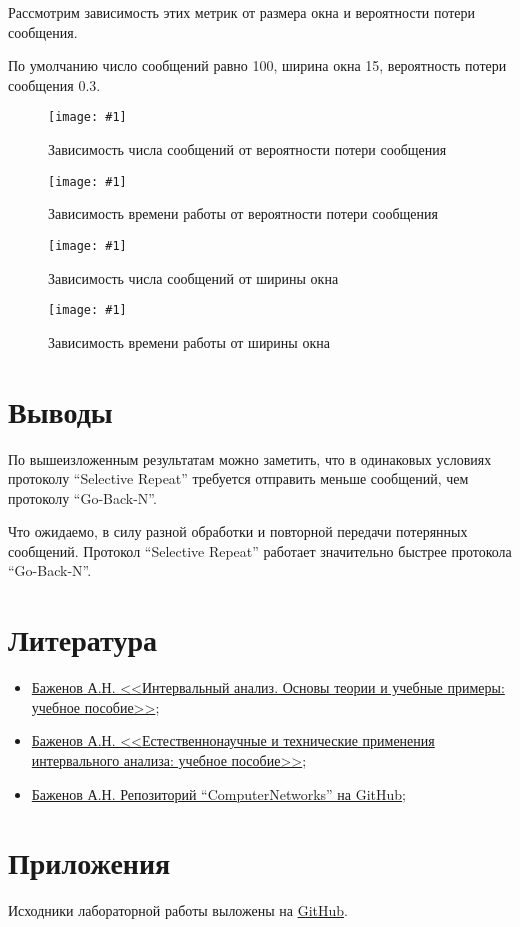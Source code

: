 \documentclass[a4paper,12pt]{article}
\newcommand{\plot}[3]{
  \begin{figure}[H]
    \begin{center}
      \texttt{[image: \#1]}
      \caption{#2}
      \label{#3}
    \end{center}
  \end{figure}
}
\newcommand{\GoBackN}{``Go-Back-N''}
\newcommand{\SelectiveRepeat}{``Selective Repeat''}
\begin{document}
\quad Рассмотрим зависимость этих метрик от размера окна и вероятности потери
сообщения.

\quad По умолчанию число сообщений равно 100, ширина окна 15, вероятность потери
сообщения 0.3.

\plot{./images/GBN_SR_num_prob.png}{Зависимость числа сообщений от вероятности
потери сообщения}{p:n_pr}

\plot{./images/GBN_SR_time_prob.png}{Зависимость времени работы от вероятности
потери сообщения}{p:t_pr}

\plot{./images/GBN_SR_num_ws.png}{Зависимость числа сообщений от ширины
окна}{p:n_ws}

\plot{./images/GBN_SR_time_ws.png}{Зависимость времени работы от ширины
окна}{p:t_ws}

\section{Выводы}
\quad По вышеизложенным результатам можно заметить, что в одинаковых условиях
протоколу {\SelectiveRepeat} требуется отправить меньше сообщений, чем протоколу
{\GoBackN}.

\quad Что ожидаемо, в силу разной обработки и повторной передачи потерянных
сообщений. Протокол {\SelectiveRepeat} работает значительно быстрее протокола
{\GoBackN}.

\section{Литература}
\begin{itemize}
  \item \href{https://elib.spbstu.ru/dl/2/s20-76.pdf/info}{Баженов А.Н.
    <<Интервальный анализ. Основы теории и учебные примеры: учебное пособие>>};
  \item \href{https://elib.spbstu.ru/dl/5/tr/2021/tr21-169.pdf/info}{Баженов
    А.Н. <<Естественнонаучные и технические применения интервального анализа:
  учебное пособие>>};
  \item \href{https://github.com/AlexanderBazhenov/ComputerNetworks}{Баженов
    А.Н. Репозиторий ``ComputerNetworks'' на GitHub};
\end{itemize}

\section{Приложения}
\quad Исходники лабораторной работы выложены на
\href{https://github.com/MeShootIn/computer-networks/tree/lab-1}{GitHub}.
\end{document}
